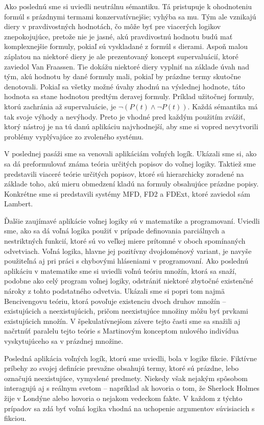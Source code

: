 \documentclass[12pt, letterpaper]{article}
\begin{document}
Ako poslednú sme si uviedli neutrálnu sémantiku. Tá pristupuje k ohodnoteniu formúl s prázdnymi termami konzervatívnejšie; vyhýba sa mu. Tým ale vznikajú diery v pravdivostných hodnotách, čo môže byť pre viacerých logikov znepokojujúce, pretože nie je jasné, akú pravdivostnú hodnotu budú mať komplexnejšie formuly, pokiaľ sú vyskladané z formúl s dierami. Aspoň malou záplatou na niektoré diery je ale prezentovaný koncept supervaluácií, ktoré zaviedol Van Fraassen. Tie dokážu niektoré diery vyplniť na základe úvah nad tým, akú hodnotu by dané formuly mali, pokiaľ by prázdne termy skutočne denotovali. Pokiaľ sa všetky možné úvahy zhodnú na výslednej hodnote, táto hodnota sa stane hodnotou predtým deravej formuly. Príklad užitočnej formuly, ktorú zachránia až supervaluácie, je $\neg(P(t) \land \neg P(t))$. Každá sémantika má tak svoje výhody a nevýhody. Preto je vhodné pred každým použitím zvážiť, ktorý nástroj je na tú danú aplikáciu najvhodnejší, aby sme si vopred nevytvorili problémy vyplývajúce zo zvoleného systému.\par
V poslednej pasáži sme sa venovali aplikáciám voľných logík. Ukázali sme si, ako sa dá preformulovať známa teória určitých popisov do voľnej logiky. Taktiež sme predstavili viaceré teórie určitých popisov, ktoré sú hierarchicky zoradené na základe toho, akú mieru obmedzení kladú na formuly obsahujúce prázdne popisy. Konkrétne sme si predstavili systémy MFD, FD2 a FDExt, ktoré zaviedol sám Lambert.\par
Ďalšie zaujímavé aplikácie voľnej logiky sú v matematike a programovaní. Uviedli sme, ako sa dá voľná logika použiť v prípade definovania parciálnych a nestriktných funkcií, ktoré sú vo veľkej miere prítomné v oboch spomínaných odvetviach. Voľná logika, hlavne jej pozitívny dvojdoménový variant, je navyše použiteľná aj pri práci s chybovými hláseniami v programovaní. Ako poslednú aplikáciu v matematike sme si uviedli voľnú teóriu množín, ktorá sa snaží, podobne ako celý program voľnej logiky, odstrániť niektoré zbytočné existenčné nároky z tohto podstatného odvetvia. Ukázali sme si popri tom najmä Bencivengovu teóriu, ktorá povoľuje existenciu dvoch druhov množín -- existujúcich a neexistujúcich, pričom neexistujúce množiny môžu byť prvkami existujúcich množín. V špekulatívnejšom závere tejto časti sme sa snažili aj načrtnúť paralelu tejto teórie s Martinovým konceptom nulového indivídua vyskytujúceho sa v prázdnej množine.\par
Posledná aplikácia voľných logík, ktorú sme uviedli, bola v logike fikcie. Fiktívne príbehy zo svojej definície prevažne obsahujú termy, ktoré sú prázdne, lebo označujú neexistujúce, vymyslené predmety. Niekedy však nejakým spôsobom interagujú aj s reálnym svetom -- napríklad ak hovoria o tom, že Sherlock Holmes žije v Londýne alebo hovoria o nejakom vedeckom fakte. V každom z týchto prípadov sa zdá byť voľná logika vhodná na uchopenie argumentov súvisiacich s fikciou.\par
\pagebreak
\end{document}
